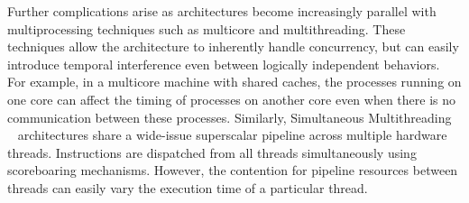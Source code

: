 Further complications arise as architectures become increasingly parallel with multiprocessing techniques such as multicore and multithreading.
These techniques allow the architecture to inherently handle concurrency, but can easily introduce temporal interference even between logically independent behaviors.
For example, in a multicore machine with shared caches, the processes running on one core can affect the timing of processes on another core even when there is no communication between these processes.
Similarly, Simultaneous Multithreading ~\cite{Eggers97simultaneousmultithreading} architectures share a wide-issue superscalar pipeline across multiple hardware threads.
Instructions are dispatched from all threads simultaneously using scoreboaring mechanisms.
However, the contention for pipeline resources between threads can easily vary the execution time of a particular thread. 

